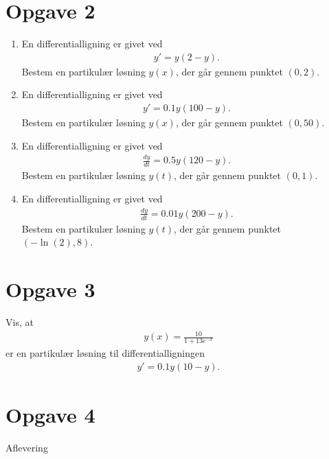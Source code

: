 \section*{Opgave 2}
\begin{enumerate}[label=\roman*)]
	\item En differentialligning er givet ved
	\begin{align*}
		y' = y(2-y).
	\end{align*}
	Bestem en partikulær løsning $y(x)$, der går gennem punktet $(0,2)$. 
	\item En differentialligning er givet ved
	\begin{align*}
		y' = 0.1y(100-y).
	\end{align*}
	Bestem en partikulær løsning $y(x)$, der går gennem punktet $(0,50)$. 
	\item En differentialligning er givet ved
	\begin{align*}
		\frac{dy}{dt} = 0.5y(120-y).
	\end{align*}
	Bestem en partikulær løsning $y(t)$, der går gennem punktet $(0,1)$. 
	\item En differentialligning er givet ved
	\begin{align*}
		\frac{dy}{dt} = 0.01y(200-y).
	\end{align*}
	Bestem en partikulær løsning $y(t)$, der går gennem punktet $(-\ln(2),8)$. 
\end{enumerate}

\section*{Opgave 3}
Vis, at 
\begin{align*}
	y(x) = \frac{10}{1+13e^{-x}}
\end{align*}
er en partikulær løsning til differentialligningen
\begin{align*}
	y' = 0.1y(10-y).
\end{align*}

\section*{Opgave 4}
Aflevering